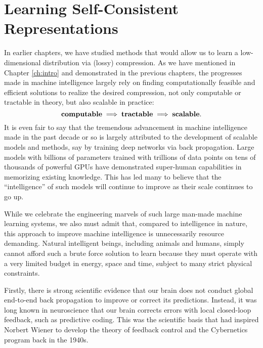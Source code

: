 \documentclass[\toplevelprefix/book-main.tex]{subfiles}
\begin{document}

\section{Learning Self-Consistent Representations}
\label{sec:self-consistency}

In earlier chapters, we have studied methods that would allow us to learn a low-dimensional distribution via (lossy) compression. As we have mentioned in Chapter \ref{ch:intro} and demonstrated in the previous chapters, the progresses made in machine intelligence largely rely on finding computationally feasible and efficient solutions to realize the desired compression, not only computable or tractable in theory, but also scalable in practice:
\begin{equation}
\mbox{\textbf{computable}} \;
   \Longrightarrow \; \mbox{\textbf{tractable}} \; \Longrightarrow \; 
   \mbox{\textbf{scalable}}.
\end{equation}
It is even fair to say that the tremendous advancement in machine intelligence made in the past decade or so is largely attributed to the development of scalable models and methods, say by training deep networks via back propagation. Large models with billions of parameters trained with trillions of data points on tens of thousands of powerful GPUs have demonstrated super-human capabilities in memorizing existing knowledge. This has led many to believe that the ``intelligence'' of such models will continue to improve as their scale continues to go up. 

While we celebrate the engineering marvels of such large man-made machine learning  systems, we also must admit that, compared to intelligence in nature, this approach to improve machine intelligence is unnecessarily resource demanding. Natural intelligent beings, including animals and humans, simply cannot afford such a brute force solution to learn because they must operate with a very limited budget in energy, space and time, subject to many strict physical constraints. 

Firstly, there is strong scientific evidence that our brain does not conduct global end-to-end back propagation to improve or correct its predictions. Instead, it was long known in neuroscience that our brain corrects errors with local closed-loop feedback, such as predictive coding. This was the scientific basis that had inspired Norbert Wiener to develop the theory of feedback control and the Cybernetics program back in the 1940s. 
\end{document}
